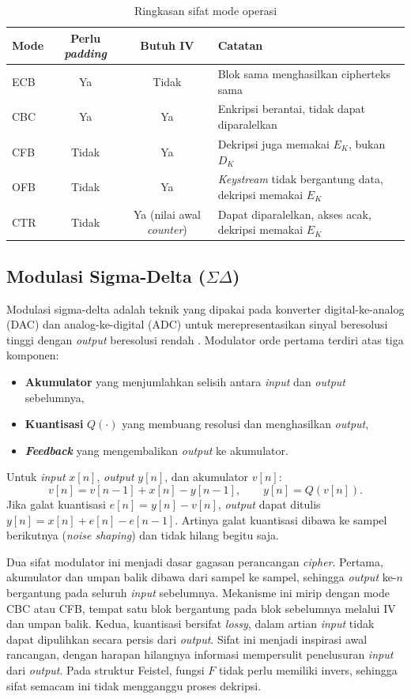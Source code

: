 \begin{table}[H]
  \centering
  \caption{Ringkasan sifat mode operasi}
  \begin{tabular}{lccp{5cm}}
    \toprule
    Mode & Perlu \textit{padding} & Butuh IV & Catatan \\
    \midrule
    ECB & Ya & Tidak & Blok sama menghasilkan cipherteks sama \\
    CBC & Ya & Ya & Enkripsi berantai, tidak dapat diparalelkan \\
    CFB & Tidak & Ya & Dekripsi juga memakai $E_K$, bukan $D_K$ \\
    OFB & Tidak & Ya & \textit{Keystream} tidak bergantung data, dekripsi memakai $E_K$ \\
    CTR & Tidak & Ya (nilai awal \textit{counter}) & Dapat diparalelkan, akses acak, dekripsi memakai $E_K$ \\
    \bottomrule
  \end{tabular}
\end{table}

\subsection{Modulasi Sigma-Delta (\texorpdfstring{$\Sigma\Delta$}{SD})}
Modulasi sigma-delta adalah teknik yang dipakai pada konverter digital-ke-analog (DAC) dan
analog-ke-digital (ADC) untuk merepresentasikan sinyal beresolusi tinggi dengan \textit{output}
beresolusi rendah \cite{schreier}. Modulator orde pertama terdiri atas tiga komponen:
\begin{itemize}
  \item \textbf{Akumulator} yang menjumlahkan selisih antara \textit{input} dan \textit{output} sebelumnya,
  \item \textbf{Kuantisasi} $Q(\cdot)$ yang membuang resolusi dan menghasilkan \textit{output},
  \item \textit{\textbf{Feedback}} yang mengembalikan \textit{output} ke akumulator.
\end{itemize}
Untuk \textit{input} $x[n]$, \textit{output} $y[n]$, dan akumulator $v[n]$:
\begin{equation}
  v[n] = v[n-1] + x[n] - y[n-1], \qquad y[n] = Q(v[n]).
\end{equation}
Jika galat kuantisasi $e[n] = y[n] - v[n]$, \textit{output} dapat ditulis
$y[n] = x[n] + e[n] - e[n-1]$. Artinya galat kuantisasi dibawa ke sampel berikutnya (\textit{noise
shaping}) dan tidak hilang begitu saja.

Dua sifat modulator ini menjadi dasar gagasan perancangan \textit{cipher}. Pertama,
akumulator dan umpan balik dibawa dari sampel ke sampel, sehingga \textit{output} ke-$n$ bergantung
pada seluruh \textit{input} sebelumnya. Mekanisme ini mirip dengan mode CBC atau CFB, tempat satu
blok bergantung pada blok sebelumnya melalui IV dan umpan balik. Kedua, kuantisasi bersifat
\textit{lossy}, dalam artian \textit{input} tidak dapat dipulihkan secara persis dari \textit{output}. Sifat ini menjadi
inspirasi awal rancangan, dengan harapan hilangnya informasi mempersulit penelusuran \textit{input}
dari \textit{output}. Pada struktur Feistel, fungsi $F$ tidak perlu memiliki invers, sehingga
sifat semacam ini tidak mengganggu proses dekripsi.

